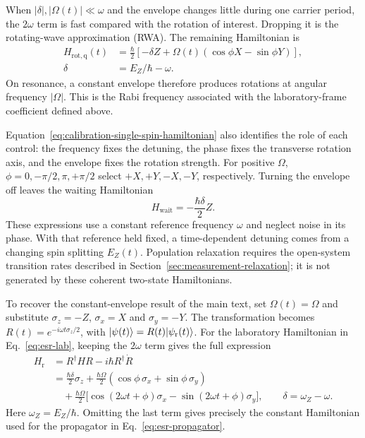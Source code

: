 When $|\delta|,|\Omega(t)|\ll\omega$ and the envelope changes
little during one carrier
period, the $2\omega$ term is fast compared with the rotation of
interest. Dropping it is the rotating-wave approximation (RWA).
The remaining Hamiltonian is
\begin{equation}
 \begin{aligned}
 H_{\mathrm{rot,q}}(t)&=\frac{\hbar}{2}
 \left[-\delta Z+
  \Omega(t)(\cos\phi X-\sin\phi Y)\right],\\
 \delta&=E_Z/\hbar-\omega.
 \end{aligned}
 \label{eq:calibration-single-spin-hamiltonian}
\end{equation}
On resonance, a constant envelope therefore produces rotations
at angular frequency $|\Omega|$. This is the Rabi frequency
associated with the laboratory-frame coefficient defined above.

Equation~\eqref{eq:calibration-single-spin-hamiltonian} also
identifies the role of each control: the frequency fixes the
detuning, the phase fixes the transverse rotation axis, and the
envelope fixes the rotation strength. For positive $\Omega$,
$\phi=0,-\pi/2,\pi,+\pi/2$ select $+X,+Y,-X,-Y$, respectively.
Turning the envelope off leaves the waiting Hamiltonian
\[
 H_{\mathrm{wait}}=-\frac{\hbar\delta}{2}Z.
\]
These expressions use a constant reference frequency $\omega$
and neglect noise in its phase. With that reference held fixed,
a time-dependent detuning comes from a changing spin splitting
$E_Z(t)$. Population relaxation requires the open-system transition
rates described in Section~\ref{sec:measurement-relaxation};
it is not generated by these coherent two-state Hamiltonians.

To recover the constant-envelope result of the main text, set
$\Omega(t)=\Omega$ and substitute
$\sigma_z=-Z$, $\sigma_x=X$ and $\sigma_y=-Y$.
The transformation becomes $R(t)=e^{-i\omega t\sigma_z/2}$,
with $\lvert \psi(t)\rangle=R(t)\lvert \psi_{\mathrm r}(t)\rangle$.
For the laboratory Hamiltonian in Eq.~\eqref{eq:esr-lab},
keeping the $2\omega$ term gives the full expression
\begin{equation}
 \begin{aligned}
 H_{\mathrm r}
 &=R^\dagger HR-i\hbar R^\dagger\dot R\\
 &=\frac{\hbar\delta}{2}\sigma_z
   +\frac{\hbar\Omega}{2}
       (\cos\phi\,\sigma_x+\sin\phi\,\sigma_y)\\
 &\quad+\frac{\hbar\Omega}{2}
       \bigl[\cos(2\omega t+\phi)\sigma_x
             -\sin(2\omega t+\phi)\sigma_y\bigr],
 \qquad \delta=\omega_Z-\omega.
 \end{aligned}
 \label{eq:esr-rotating}
\end{equation}
Here $\omega_Z=E_Z/\hbar$. Omitting the last term gives precisely
the constant Hamiltonian used for the propagator in
Eq.~\eqref{eq:esr-propagator}.
